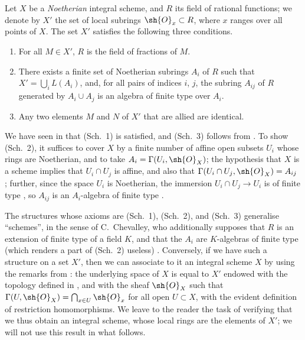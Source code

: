 \begin{env}[8.3.1]
\label{I.8.3.1}
Let $X$ be a \emph{Noetherian} integral scheme, and $R$ its field of rational functions;
we denote by $X'$ the set of local subrings $\sh{O}_x\subset R$, where $x$ ranges over all points of $X$.
The set $X'$ satisfies the following three conditions.
\begin{enumerate}
  \item[(Sch.~1)] For all $M\in X'$, $R$ is the field of fractions of $M$.
  \item[(Sch.~2)] There exists a finite set of Noetherian subrings $A_i$ of $R$ such that $X'=\bigcup_i L(A_i)$, and, for all pairs of indices $i$, $j$, the subring $A_{ij}$ of $R$ generated by $A_i\cup A_j$ is an algebra of finite type over $A_i$.
  \item[(Sch.~3)] Any two elements $M$ and $N$ of $X'$ that are allied are identical.
\end{enumerate}
\end{env}

We have seen in  that (Sch.~1) is satisfied, and (Sch.~3) follows from .
To show (Sch.~2), it suffices to cover $X$ by a finite number of affine open subsets $U_i$ whose rings are Noetherian, and to take $A_i=\Gamma(U_i,\sh{O}_X)$;
the hypothesis that $X$ is a scheme implies that $U_i\cap U_j$ is affine, and also that $\Gamma(U_i\cap U_j,\sh{O}_X)=A_{ij}$ ;
further, since the space $U_i$ is Noetherian, the immersion $U_i\cap U_j\to U_i$ is of finite type , so $A_{ij}$ is an $A_i$-algebra of finite type .

\begin{env}[8.3.2]
\label{I.8.3.2}
The structures whose axioms are (Sch.~1), (Sch.~2), and (Sch.~3) generalise ``schemes'', in the sense of C.~Chevalley, who additionally supposes that $R$ is an extension of finite type of a field $K$, and that the $A_i$ are $K$-algebras of finite type (which renders a part of (Sch.~2) useless) \cite{I-1}.
Conversely, if we have such a structure on a set $X'$, then we can associate to it an integral scheme $X$ by using the remarks from : the underlying space of $X$ is equal to $X'$ endowed with the topology defined in , and with the sheaf $\sh{O}_X$
such that $\Gamma(U,\sh{O}_X)=\bigcap_{x\in U}\sh{O}_x$ for all open $U\subset X$, with the evident definition of restriction homomorphisms.
We leave to the reader the task of verifying that we thus obtain an integral scheme, whose local rings are the elements of $X'$;
we will not use this result in what follows.
\end{env}
